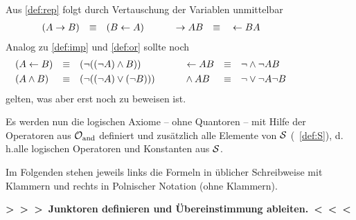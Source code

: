 \documentclass[english,ngerman,parskip=half,headsepline,footsepline,
	fleqn,notitlepage]{scrreprt}
\makeatletter
\newcommand*{\formulatoleft}{&&&&&&&&&&}%
\newcommand*{\formulaspace}{&&&&}%
\newcommand*{\todo}[1]{\textbf{>~>~>~#1~<~<~<}}%
\newcommand*{\subsubsectionname}{Paragraph}
\newcommand*{\textdh}{d.\@\,h.\@ }
\makeatother
\begin{document}
	Aus \ref{def:rep} folgt durch Vertauschung der Variablen unmittelbar
	\begin{align}
		&                 (A \limp B) & \equiv & & & (B \lrep A)
		& \formulaspace &   \limp A B & \equiv & & & \lrep B A
		\label{eq:imp}   \formulatoleft
	\end{align}
	Analog zu \ref{def:imp} und \ref{def:or} sollte noch
	\begin{align}
		&                 (A \lrep B) & \equiv & & & (\lnot ((\lnot A) \land B))
		& \formulaspace &   \lrep A B & \equiv & & & \lnot \land \lnot A B
		\label{eq:ref}   \\
		&             (A \land B) & \equiv & & & (\lnot((\lnot A)\lor(\lnot B)))
		& \formulaspace &   \land A B & \equiv & & & \lnot \lor \lnot A \lnot B
		\label{eq:and}    \formulatoleft
	\end{align}
	gelten, was aber erst noch zu beweisen ist.

	Es werden nun die logischen Axiome
	-- ohne Quantoren --
	mit Hilfe der Operatoren aus $\mathcal{O}_\mathrm{and}$ definiert
	und zusätzlich alle Elemente von $\mathcal{S}$ (\seename~\vref{def:S}),
	\textdh alle logischen Operatoren und Konstanten aus $\mathcal{S}$.

	Im Folgenden stehen jeweils
	links die Formeln in üblicher Schreibweise mit Klammern
	und rechts in Polnischer Notation (ohne Klammern).

\todo{Junktoren definieren und Übereinstimmung ableiten.}%
\end{document}
